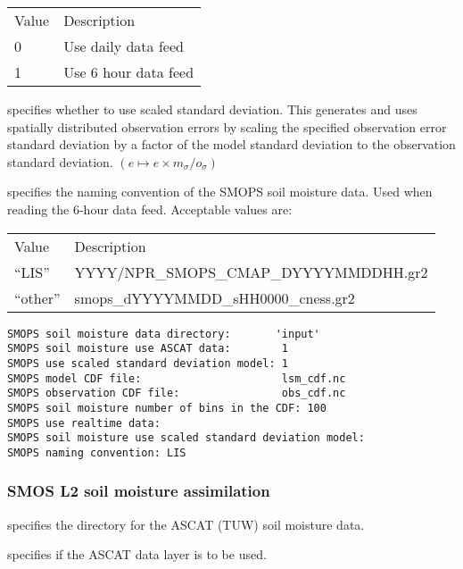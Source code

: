  \begin{tabular}{ll}
 Value & Description          \\
 0     & Use daily data feed  \\
 1     & Use 6 hour data feed \\
 \end{tabular}

  specifies whether to use scaled standard deviation.
 This generates and uses spatially distributed observation
 errors by scaling the specified observation error standard
 deviation by a factor of the model standard deviation to the
 observation standard deviation.
 $ ( e \mapsto e \times m_\sigma / o_\sigma ) $

  specifies the naming convention of the 
 SMOPS soil moisture data.  Used when reading the 6-hour data feed.
 Acceptable values are: 

 \begin{tabular}{ll}
 Value     & Description                            \\
 ``LIS''   & YYYY/NPR\_SMOPS\_CMAP\_DYYYYMMDDHH.gr2 \\
 ``other'' & smops\_dYYYYMMDD\_sHH0000\_cness.gr2   \\
 \end{tabular}
 

 \begin{Verbatim}[frame=single]
SMOPS soil moisture data directory:       'input'
SMOPS soil moisture use ASCAT data:        1
SMOPS use scaled standard deviation model: 1
SMOPS model CDF file:                      lsm_cdf.nc
SMOPS observation CDF file:                obs_cdf.nc
SMOPS soil moisture number of bins in the CDF: 100 
SMOPS use realtime data:
SMOPS soil moisture use scaled standard deviation model:
SMOPS naming convention: LIS
 \end{Verbatim}

 
 
 \subsubsection{SMOS L2 soil moisture assimilation}
 \label{sssec:smosl2smda}
 

 
  specifies the directory
 for the ASCAT (TUW) soil moisture data.

  specifies if the 
 ASCAT data layer is to be used.

